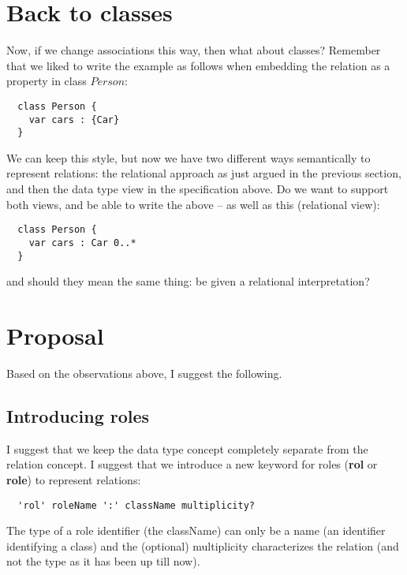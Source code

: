 \documentclass{llncs}
\begin{document}
\section{Back to classes}
\label{sec:classes}

Now, if we change associations this way, then what about classes? Remember that we liked to write the example as follows when embedding the 
relation as a property in class $Person$:

\sk
\begin{lstlisting}
  class Person {
    var cars : {Car}
  }
\end{lstlisting}

\noindent
We can keep this style, but now we have two different ways semantically
to represent relations: the relational approach as just argued in the 
previous section, and then the data type view in the specification 
above. Do we want to support both views, and be able to write 
the above -- as well as this (relational view):

\sk
\begin{lstlisting}
  class Person {
    var cars : Car 0..*
  }
\end{lstlisting}

\noindent
and should they mean the same thing: be given a relational interpretation?

\section{Proposal}
\label{sec:proposal}

Based on the observations above, I suggest the following.

\subsection{Introducing roles}

I suggest that we keep the data type concept completely separate from the relation concept. I suggest that we introduce a new keyword for roles ({\bf rol} or {\bf role}) to represent relations: 

\sk
\begin{lstlisting}
  'rol' roleName ':' className multiplicity?
\end{lstlisting}

\noindent
The type of a role identifier (the className) can only be a name (an identifier identifying a class) and the (optional) multiplicity characterizes the relation (and not the type as it has been up till now). 
\end{document}
